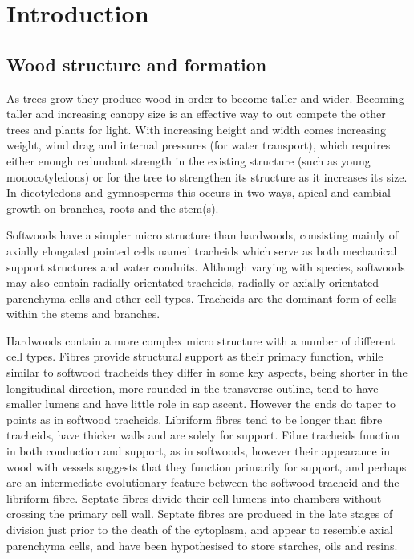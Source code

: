 \documentclass{article}
\begin{document}
\section{Introduction}



\subsection{Wood structure and formation}
As trees grow they produce wood in order to become taller and wider. Becoming
taller and increasing canopy size is an effective way to out compete the other
trees and plants for light. With increasing height and width comes increasing
weight, wind drag and internal pressures (for water transport), which requires
either enough redundant strength in the existing structure (such as young monocotyledons) or
for the tree to strengthen its structure as it increases its size. In
dicotyledons and gymnosperms this occurs in two ways, apical and cambial growth
on branches, roots and the stem(s).

Softwoods have a simpler micro structure than hardwoods, consisting mainly of
axially elongated pointed cells named tracheids which serve as both mechanical
support structures and water conduits. Although varying with species, softwoods
may also contain radially orientated tracheids, radially or axially orientated
parenchyma cells and other cell types. Tracheids are the dominant form of cells
within the stems and branches.

Hardwoods contain a more complex micro structure with a number
of different cell types. Fibres provide structural support as their primary
function, while similar to softwood tracheids they differ in some key aspects,
being shorter in the longitudinal direction, more rounded in the transverse
outline, tend to have smaller lumens and have little role in sap ascent.
However the ends do taper to points as in softwood tracheids. Libriform fibres tend to
be longer than fibre tracheids, have thicker walls and are solely for support.
Fibre tracheids function in both conduction and support, as in softwoods,
however their appearance in wood with vessels suggests that they function
primarily for support, and perhaps are an intermediate evolutionary feature
between the softwood tracheid and the libriform fibre. Septate fibres divide
their cell lumens into chambers without crossing the primary cell wall. Septate
fibres are produced in the late stages of division just prior to the death of
the cytoplasm, and appear to resemble axial parenchyma cells, and have been
hypothesised to store starches, oils and resins.
\end{document}
